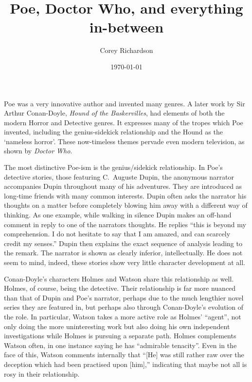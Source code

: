 \documentclass[12pt]{article}
\title{Poe, Doctor Who, and everything in-between}
\date{\today}
\author{Corey Richardson}
\begin{document}
\setlength{\parindent}{1in}

\maketitle
\thispagestyle{empty}
\newpage
\setcounter{page}{1}

Poe was a very innovative author and invented many genres. A later work by Sir
Arthur Conan-Doyle, \emph{Hound of the Baskervilles}, had elements of both the
modern Horror and Detective genres. It expresses many of the tropes which Poe
invented, including the genius-sidekick relationship and the Hound as the
`nameless horror'. These now-timeless themes pervade even modern television,
as shown by \emph{Doctor Who}.

The most distinctive Poe-ism is the genius/sidekick relationship. In Poe's
detective stories, those featuring C.\ Auguste Dupin, the anonymous narrator
accompanies Dupin throughout many of his adventures. They are introduced as
long-time friends with many common interests. Dupin often asks the narrator
his thoughts on a matter before completely blowing him away with a different
way of thinking. As one example, while walking in silence Dupin makes an
off-hand comment in reply to one of the narrators thoughts. He replies ``this
is beyond my comprehension. I do not hesitate to say that I am amazed, and can
scarcely credit my senses.'' Dupin then explains the exact sequence of
analysis leading to the remark. The narrator is shown as clearly inferior,
intellectually. He does not seem to mind, indeed, these stories show very
little character development at all.

Conan-Doyle's characters Holmes and Watson share this relationship as well.
Holmes, of course, being the detective. Their relationship is far more nuanced
than that of Dupin and Poe's narrator, perhaps due to the much lengthier novel
series they are featured in, but perhaps also through Conan-Doyle's evolution
of the role. In particular, Watson takes a more active role as Holmes'
``agent'', not only doing the more uninteresting work but also doing his own
independent investigations while Holmes is pursuing a separate path. Holmes
complements Watson often, in one instance saying he has ``admirable
tenacity''. Even in the face of this, Watson comments internally that ``[He] was
still rather raw over the deception which had been practised upon [him],''
indicating that maybe not all is rosy in their relationship.
\end{document}
